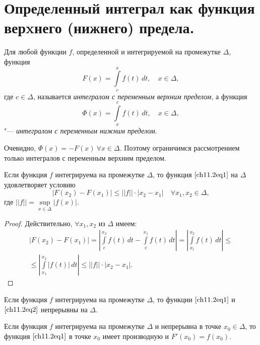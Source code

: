 \section{Определенный интеграл как функция верxнего (нижнего) предела.}

Для любой функции $f$, определенной и интегрируемой на промежутке $\Delta$, функция
\begin{equation} \label{ch11.2eq1}
F(x) = \int\limits_{c}^{x} f(t) \,dt, \quad x \in \Delta,
\end{equation}
где $c \in \Delta$, называется \textit{интегралом с переменным верхним пределом}, а функция
\begin{equation} \label{ch11.2eq2}
\Phi(x) = \int\limits_{x}^{c} f(t) \,dt, \quad x \in \Delta,
\end{equation}
"--- \textit{интегралом с переменным нижним пределом}.

Очевидно, $\Phi(x) = -F(x)\ \forall x \in \Delta$. Поэтому ограничимся рассмотрением только интегралов с переменным верхним пределом.

\begin{thm}
Если функция $f$ интегрируема на промежутке $\Delta$, то функция $\eqref{ch11.2eq1}$ на $\Delta$ удовлетворяет условию
$$
|F(x_2) - F(x_1)| \le ||f|| \cdot |x_2 - x_1| \quad \forall x_1, x_2 \in \Delta,
$$
где $||f|| = \sup\limits_{x \in \Delta} |f(x)|$.
\end{thm}

\begin{proof}
Действительно, $\forall x_1, x_2$ из $\Delta$ имеем:
\begin{multline*}
|F(x_2) - F(x_1)| = \left| \int\limits_{c}^{x_2}f(t) \,dt - \int\limits_{c}^{x_1} f(t) \,dt\right| = \left| \int\limits_{x_1}^{x_2}f(t) \,dt \right| \le\\ \le \left| \int\limits_{x_1}^{x_2}|f(t)| \,dt \right| \le ||f|| \cdot |x_2 - x_1|.\tag*{$\qedhere$}
\end{multline*}
\end{proof}

\begin{cons}
Если функция $f$ интегрируема на промежутке $\Delta$, то функции $\eqref{ch11.2eq1}$ и $\eqref{ch11.2eq2}$ непрерывны на $\Delta$.
\end{cons}

\begin{thm}
Если функция $f$ интегрируема на промежутке $\Delta$ и непрерывна в точке $x_0 \in \Delta$, то функция $\eqref{ch11.2eq1}$ в точке $x_0$ имеет производную и $F'(x_0) = f(x_0)$.
\end{thm}

